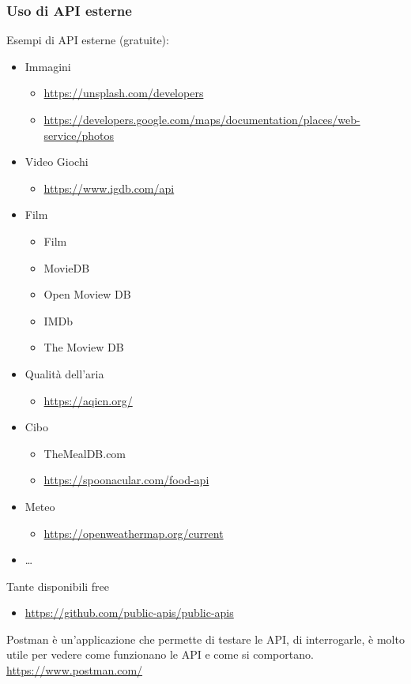 \subsubsection{Uso di API esterne}
\par Esempi di API esterne (gratuite):
\begin{itemize}
    \item Immagini
    \begin{itemize}
        \item \url{https://unsplash.com/developers}
        \item \url{https://developers.google.com/maps/documentation/places/web-service/photos}
    \end{itemize}
    \item Video Giochi
    \begin{itemize}
        \item \url{https://www.igdb.com/api}
    \end{itemize}
    \item Film
    \begin{itemize}
        \item Film
        \item MovieDB
        \item Open Moview DB
        \item IMDb
        \item The Moview DB
    \end{itemize}
    \item Qualità dell'aria
    \begin{itemize}
        \item \url{https://aqicn.org/}
    \end{itemize}
    \item Cibo
    \begin{itemize}
        \item TheMealDB.com
        \item \url{https://spoonacular.com/food-api}
    \end{itemize}
    \item Meteo
    \begin{itemize}
        \item \url{https://openweathermap.org/current}
    \end{itemize}
    \item …
\end{itemize}
\par Tante disponibili free
\begin{itemize}
    \item \url{https://github.com/public-apis/public-apis}
\end{itemize}
\par Postman è un'applicazione che permette di testare le API, di interrogarle, è molto utile per vedere come funzionano le API e come si comportano. \url{https://www.postman.com/}

